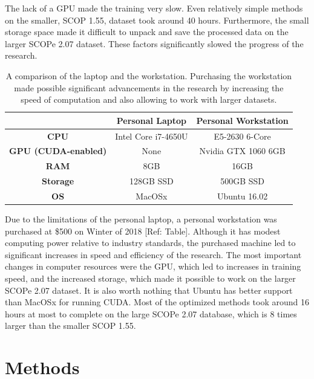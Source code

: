 \documentclass[12pt, a4paper, twocolumn, fullpage]{article}
\theoremstyle{plain}
\theoremstyle{definition}
\theoremstyle{remark}
\begin{document}
The lack of a GPU made the training very slow. Even relatively simple methods on the smaller, SCOP 1.55, dataset took around 40 hours. Furthermore, the small storage space made it difficult to unpack and save the processed data on the larger SCOPe 2.07 dataset. These factors significantly slowed the progress of the research.


\begin{table}[h]
    \centering
    \begin{tabular}{|c | c | c |}
    	\hline
    	                    &  \textbf{Personal Laptop} &  \textbf{Personal Workstation} \\ \hline
        \textbf{CPU} & Intel Core i7-4650U &  E5-2630 6-Core \\ \hline
         \textbf{GPU (CUDA-enabled)} & None & Nvidia GTX 1060 6GB      \\ \hline
         \textbf{RAM} & 8GB & 16GB   \\ \hline
         \textbf{Storage} & 128GB SSD & 500GB SSD \\ \hline
         \textbf{OS} & MacOSx   & Ubuntu 16.02 \\ \hline
    \end{tabular}
    \caption{A comparison of the laptop and the workstation. Purchasing the workstation made possible significant advancements in the research by increasing the speed of computation and also allowing to work with larger datasets. }
    \label{tbl:Computers}
\end{table}

Due to the limitations of the personal laptop, a personal workstation was purchased at \$500 on Winter of 2018 [Ref: Table]. Although it has modest computing power relative to industry standards, the purchased machine led to significant increases in speed and efficiency of the research. The most important changes in computer resources were the GPU, which led to increases in training speed, and the increased storage, which made it possible to work on the larger SCOPe 2.07 dataset. It is also worth nothing that Ubuntu has better support than MacOSx for running CUDA.
Most of the optimized methods took around 16 hours at most to complete on the large SCOPe 2.07 database, which is 8 times larger than the smaller SCOP 1.55. 


\section{Methods}
\end{document}
